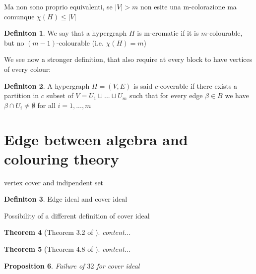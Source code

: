 \documentclass[]{book}
\theoremstyle{plain}
\newtheorem{teo}{Theorem}[section]
\newtheorem{prop}[teo]{Proposition}
\theoremstyle{remark}
\theoremstyle{definition}
\newtheorem{deff}[teo]{Definiton}
\begin{document}
\begin{tboxque}
Ma non sono proprio equivalenti, se $ |V| > m $ non esite una m-colorazione ma comunque $ \chi(H) \leq |V| $
\end{tboxque}

\begin{deff}
We say that a hypergraph $ H $ is m-cromatic if it is $ m $-colourable, but no $ (m-1) $-colourable (i.e. $\chi(H) = m  $)
\end{deff}

We see now a stronger definition, that also require at every block to have vertices of every colour:

\begin{deff}
A hypergraph $ H = (V,E) $ is said $ c $-coverable if there exists a partition in $ c $ subset of $ V = U_1 \sqcup ... \sqcup U_m $ such that for every edge $ \beta \in B $ we have $ \beta \cap U_i \neq \emptyset$ for all $ i = 1, ... , m $
\end{deff}

\section{Edge between algebra and colouring theory}

vertex cover and indipendent set

\begin{deff}\label{def:coverideal}
Edge ideal and cover ideal
\end{deff}

Possibility of a different definition of cover ideal

\begin{teo}[Theorem 3.2 of \cite{Fran10Colourings}] \label{teo:col:chi}
content...
\end{teo}

\begin{teo}[Theorem 4.8 of \cite{Bal21Steiner}] \label{teo:col:cont}
content...
\end{teo}


\begin{prop}
Failure of $ 32 $ for cover ideal
\end{prop}
\backmatter
\printbibliography
\end{document}
